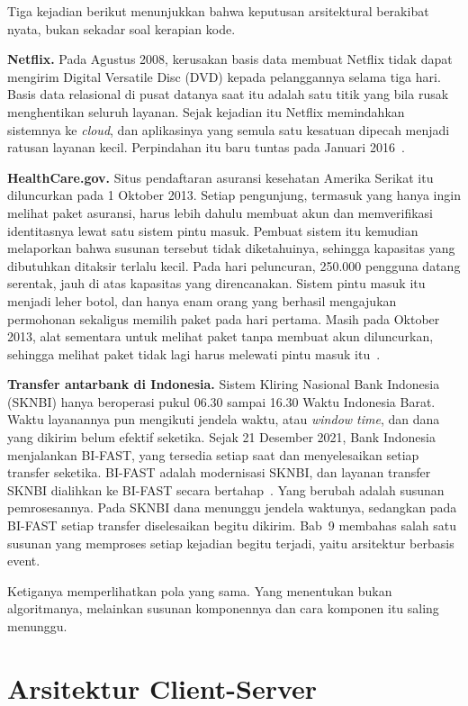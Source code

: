 Tiga kejadian berikut menunjukkan bahwa keputusan arsitektural berakibat nyata,
bukan sekadar soal kerapian kode.

\textbf{Netflix.} Pada Agustus 2008, kerusakan basis data membuat Netflix tidak
dapat mengirim Digital Versatile Disc (DVD) kepada pelanggannya selama tiga
hari. Basis data relasional di pusat datanya saat itu adalah satu titik yang
bila rusak menghentikan seluruh layanan. Sejak kejadian itu Netflix memindahkan
sistemnya ke \textit{cloud}, dan aplikasinya yang semula satu kesatuan dipecah
menjadi ratusan layanan kecil. Perpindahan itu baru tuntas pada Januari
2016~\cite{izrailevsky2016netflix}.

\textbf{HealthCare.gov.} Situs pendaftaran asuransi kesehatan Amerika Serikat
itu diluncurkan pada 1 Oktober 2013. Setiap pengunjung, termasuk yang hanya
ingin melihat paket asuransi, harus lebih dahulu membuat akun dan memverifikasi
identitasnya lewat satu sistem pintu masuk. Pembuat sistem itu kemudian
melaporkan bahwa susunan tersebut tidak diketahuinya, sehingga kapasitas yang
dibutuhkan ditaksir terlalu kecil. Pada hari peluncuran, 250.000 pengguna datang
serentak, jauh di atas kapasitas yang direncanakan. Sistem pintu masuk itu
menjadi leher botol, dan hanya enam orang yang berhasil mengajukan permohonan
sekaligus memilih paket pada hari pertama. Masih pada Oktober 2013, alat
sementara untuk melihat paket tanpa membuat akun diluncurkan, sehingga melihat
paket tidak lagi harus melewati pintu masuk itu~\cite{oig2016healthcare}.

\textbf{Transfer antarbank di Indonesia.} Sistem Kliring Nasional Bank Indonesia
(SKNBI) hanya beroperasi pukul 06.30 sampai 16.30 Waktu Indonesia Barat. Waktu
layanannya pun mengikuti jendela waktu, atau \textit{window time}, dan dana yang
dikirim belum efektif seketika. Sejak 21 Desember 2021, Bank Indonesia
menjalankan BI-FAST, yang tersedia setiap saat dan menyelesaikan setiap transfer
seketika. BI-FAST adalah modernisasi SKNBI, dan layanan transfer SKNBI dialihkan
ke BI-FAST secara bertahap~\cite{bi2026bifast}. Yang berubah adalah susunan
pemrosesannya. Pada SKNBI dana menunggu jendela waktunya, sedangkan pada BI-FAST
setiap transfer diselesaikan begitu dikirim. Bab~9 membahas salah satu susunan
yang memproses setiap kejadian begitu terjadi, yaitu arsitektur berbasis event.

Ketiganya memperlihatkan pola yang sama. Yang menentukan bukan algoritmanya,
melainkan susunan komponennya dan cara komponen itu saling menunggu.

\section{Arsitektur Client-Server}


